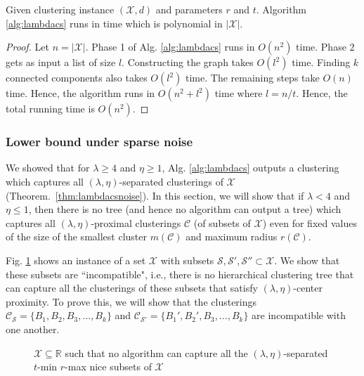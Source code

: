 \documentclass[anon,12pt]{colt2016} %
\newcommand{\mc}{\mathcal}
\begin{document}
\begin{theorem}
Given clustering instance $(\mc X, d)$ and parameters $r$ and $t$. Algorithm \ref{alg:lambdacs} runs in time which is polynomial in $|\mc X|$.
\end{theorem}

\begin{proof}
Let $n = |\mc X|$. Phase 1 of Alg. \ref{alg:lambdacs} runs in $O(n^2)$ time. Phase 2 gets as input a list of size $l$. Constructing the graph takes $O(l^2)$ time. Finding $k$ connected components also takes $O(l^2)$ time. The remaining steps take $O(n)$ time. Hence, the algorithm runs in $O(n^2 + l^2)$ time where $l = n/t$. Hence, the total running time is $O(n^2)$.
\end{proof}



\subsubsection{Lower bound under sparse noise}
\label{section:lambdaLowerBoundSparse}
We showed that for $\lambda \ge 4$ and $\eta \ge 1$, Alg. \ref{alg:lambdacs} outputs a clustering which captures all $(\lambda, \eta)$-separated clusterings of $\mc X$ (Theorem.~\ref{thm:lambdacsnoise}). In this section, we will show that if $\lambda < 4$ and $\eta \le 1$, then there is no tree (and hence no algorithm can output a tree) which captures all $(\lambda, \eta)$-proximal clusterings $\mc C$ (of subsets of $\mc X$) even for fixed values of the size of the smallest cluster $m(\mc C)$ and maximum radius $r(\mc C)$.

Fig. \ref{fig:noalglambdacs} shows an instance of a set $\mc X$ with subsets $\mc S, \mc S' , \mc S'' \subset \mc X$. We show that these subsets are ``incompatible", i.e., there is no hierarchical clustering tree that can capture all the clusterings of these subsets that satisfy $(\lambda, \eta)$-center proximity. To prove this, we will show that the clusterings $\mc C_{\mc S} = \{B_1, B_2, B_3, \ldots, B_k\}$ and $\mc C_{\mc S'} = \{B_1', B_2', B_3, \ldots, B_k\}$ are incompatible with one another.

\begin{figure}

\caption{$\mc X \subseteq \mathbb{R}$ such that no algorithm can capture all the $(\lambda, \eta)$-separated $t$-min $r$-max nice subsets of $\mc X$}
\label{fig:noalglambdacs}
\end{figure}
\end{document}
